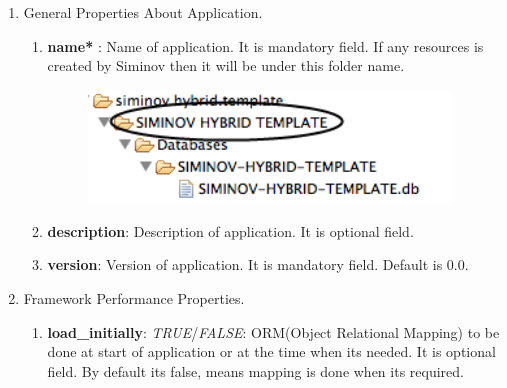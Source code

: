 \begin{enumerate}
	
	\item \small General Properties About Application.
	
		\begin{enumerate}

			\item \small \textbf{name*} : Name of application. It is mandatory field. If any resources is created by Siminov then it will be under this folder name.

			\begin{figure}[htbp]
				\centering
					\includegraphics[height=3cm]{Resources/siminov_hybrid_template_application_data_folder_structure_for_application_name.png}
			\end{figure}


			\item \small \textbf{description}: Description of application. It is optional field.
			\item \small \textbf{version}: Version of application. It is mandatory field. Default is 0.0.

		\end{enumerate}

	\item \small Framework Performance Properties.
		
		\begin{enumerate}

			\item \small \textbf{load\_initially}: \textit{TRUE}/\textit{FALSE}: ORM(Object Relational Mapping) to be done at start of application or at the time when its needed. It is optional field. By default its false, means mapping is done when its required. 

			\begin{center}
				\colorbox{grey}{
					\parbox[t]{.8\linewidth}{
						\fontsize{11pt}{11pt}\selectfont %
						\vspace*{0.1cm} %
		
}}
\end{center}
\end{enumerate}
\end{enumerate}
